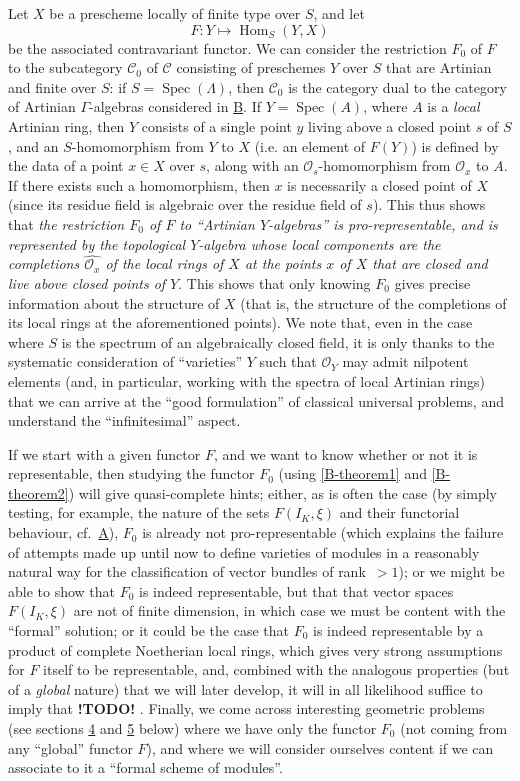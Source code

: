 \documentclass{article}
\theoremstyle{plain}
\theoremstyle{definition}
\newcommand{\sh}[1]{{\mathscr{#1}}}
\newcommand{\cat}[1]{{\mathcal{#1}}}
\DeclareMathOperator{\Hom}{Hom}
\DeclareMathOperator{\Spec}{Spec}
\newcommand{\todo}{\textbf{ !TODO! }}
\newcommand{\oldpage}[1]{\marginpar{\footnotesize$\Big\vert$ \textit{p.~#1}}}
\begin{document}
Let $X$ be a prescheme locally of finite type over $S$, and let
\[
  F\colon Y \mapsto \Hom_S(Y,X)
\]
be the associated contravariant functor.
We can consider the restriction $F_0$ of $F$ to the subcategory $\cat{C}_0$ of $\cat{C}$ consisting of preschemes $Y$ over $S$ that are Artinian and finite over $S$:
if $S=\Spec(\Lambda)$, then $\cat{C}_0$ is the category dual to the category of Artinian $\Gamma$-algebras considered in \hyperref[B]{B}.
If $Y=\Spec(A)$, where $A$ is a \emph{local} Artinian ring, then $Y$ consists of a single point $y$ living above a closed point $s$ of $S$, and an $S$-homomorphism from $Y$ to $X$ (i.e. an element of $F(Y)$) is defined by the data of a point $x\in X$ over $s$, along with an $\sh{O}_s$-homomorphism from $\sh{O}_x$ to $A$.
If there exists such a homomorphism, then $x$ is necessarily a closed point of $X$ (since its residue field is algebraic over the residue field of $s$).
This thus shows that \emph{the restriction $F_0$ of $F$ to ``Artinian $Y$-algebras'' is pro-representable, and is represented by the topological $Y$-algebra whose local components are the completions $\widehat{\sh{O}_x}$ of the local rings of $X$ at the points $x$ of $X$ that are closed and live above closed points of $Y$}.
This shows that only knowing $F_0$ gives precise information about the structure of $X$ (that is, the structure of the completions of its local rings at the aforementioned points).
We note that, even in the case where $S$
\oldpage{195-12}
is the spectrum of an algebraically closed field, it is only thanks to the systematic consideration of ``varieties'' $Y$ such that $\sh{O}_Y$ may admit nilpotent elements (and, in particular, working with the spectra of local Artinian rings) that we can arrive at the ``good formulation'' of classical universal problems, and understand the ``infinitesimal'' aspect.

If we start with a given functor $F$, and we want to know whether or not it is representable, then studying the functor $F_0$ (using \cref{B-theorem1} and \cref{B-theorem2}) will give quasi-complete hints;
either, as is often the case (by simply testing, for example, the nature of the sets $F(I_K,\xi)$ and their functorial behaviour, cf.~\hyperref[A]{A}), $F_0$ is already not pro-representable (which explains the failure of attempts made up until now to define varieties of modules in a reasonably natural way for the classification of vector bundles of rank~$>1$);
or we might be able to show that $F_0$ is indeed representable, but that that vector spaces $F(I_K,\xi)$ are not of finite dimension, in which case we must be content with the ``formal'' solution;
or it could be the case that $F_0$ is indeed representable by a product of complete Noetherian local rings, which gives very strong assumptions for $F$ itself to be representable, and, combined with the analogous properties (but of a \emph{global} nature) that we will later develop, it will in all likelihood suffice to imply that \todo.
Finally, we come across interesting geometric problems (see sections \hyperref[C.4]{4} and \hyperref[C.5]{5} below) where we have only the functor $F_0$ (not coming from any ``global'' functor $F$), and where we will consider ourselves content if we can associate to it a ``formal scheme of modules''.
\end{document}
